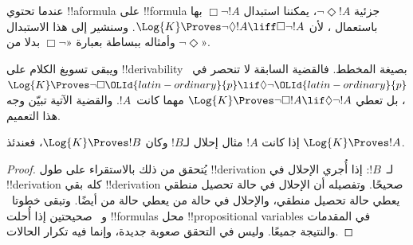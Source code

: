 \documentclass[../../../include/open-logic-section]{subfiles}
\begin{document}
عندما تحتوي !!a{formula} على !!{formula} جزئية $\lnot\Diamond !A$،
يمكننا استبدال $\Box\lnot !A$ بها باستعمال ،
لأن $\Log{K} \Proves \lnot\Diamond !A \liff \Box\lnot !A$. وسنشير
إلى هذا الاستبدال وأمثاله ببساطة بعبارة «$\Box\lnot$ بدلا من
$\lnot\Diamond$».

ويبقى تسويغ الكلام على !!{derivability} بصيغة المخطط.
فالقضية السابقة لا تنحصر في~$\Log{K} \Proves \lnot\Box \OLId{latin-ordinary}{p} \lif
\Diamond \lnot \OLId{latin-ordinary}{p}$، بل تعطي
$\Log{K} \Proves \lnot\Box !A \lif \Diamond \lnot !A$
مهما كانت~$!A$. والقضية الآتية تبيّن وجه هذا التعميم.

\begin{prop}
  إذا كانت $!A$ مثال إحلال لـ$!B$ وكان $\Log{K} \Proves !B$، فعندئذ
  $\Log{K} \Proves !A$.
\end{prop}

\begin{proof}
  يُتحقق من ذلك بالاستقراء على طول !!{derivation} لـ~$!B$:
  إذا أُجري الإحلال في !!{derivation} كله بقي !!{derivation}
  صحيحًا. وتفصيله أن الإحلال في حالة تحصيل منطقي يعطي حالة
  تحصيل منطقي، والإحلال في حالة من
   يعطي حالة من
   أيضًا.
  وتبقى خطوتا~\MP{} و~\Nec{} صحيحتين إذا أُحلت !!{formula}s
  محل !!{propositional variable}s في المقدمات والنتيجة جميعًا.
  وليس في التحقق صعوبة جديدة، وإنما فيه تكرار الحالات.
\end{proof}
\end{document}
